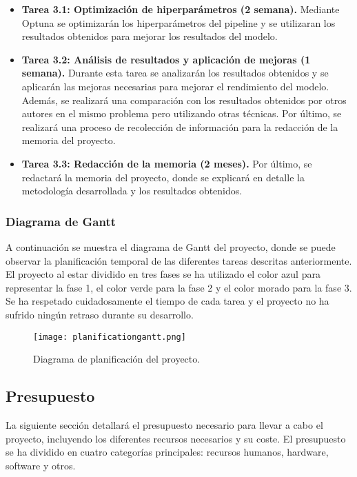 \begin{itemize}
    \item \textbf{Tarea 3.1: Optimización de hiperparámetros (2 semana).} Mediante Optuna se optimizarán los
    hiperparámetros del pipeline y se utilizaran los resultados obtenidos para mejorar los resultados del
    modelo. 
    \item \textbf{Tarea 3.2: Análisis de resultados y aplicación de mejoras (1 semana).} Durante esta tarea se
    analizarán los resultados obtenidos y se aplicarán las mejoras necesarias para mejorar el rendimiento del
    modelo. Además, se realizará una comparación con los resultados obtenidos por otros autores en el mismo
    problema pero utilizando otras técnicas. Por último, se realizará una proceso de recolección de información
    para la redacción de la memoria del proyecto. 
    \item \textbf{Tarea 3.3: Redacción de la memoria (2 meses).} Por último, se redactará la memoria del proyecto,
    donde se explicará en detalle la metodología desarrollada y los resultados obtenidos.
\end{itemize}

\subsubsection{Diagrama de Gantt}
A continuación se muestra el diagrama de Gantt del proyecto, donde se puede observar la planificación
temporal de las diferentes tareas descritas anteriormente. El proyecto al estar dividido en tres fases
se ha utilizado el color azul para representar la fase 1, el color verde para la fase 2 y el color morado
para la fase 3. Se ha respetado cuidadosamente el tiempo de cada tarea y el proyecto no ha sufrido ningún
retraso durante su desarrollo.

\begin{figure}
    \centering
    \texttt{[image: planificationgantt.png]}
    \caption{Diagrama de planificación del proyecto.}
    \label{fig:gantt-planification}
\end{figure}

\subsection{Presupuesto}
La siguiente sección detallará el presupuesto necesario para llevar a cabo el proyecto,
incluyendo los diferentes recursos necesarios y su coste. El presupuesto se ha dividido
en cuatro categorías principales: recursos humanos, hardware, software y otros. 

